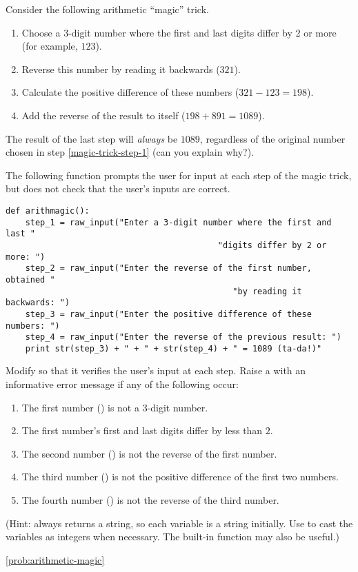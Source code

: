 \begin{problem} %
Consider the following arithmetic ``magic'' trick.
\begin{enumerate}
    \item Choose a 3-digit number where the first and last digits differ by 2 or more (for example, $123$).
    \label{magic-trick-step-1}
    \item Reverse this number by reading it backwards ($321$).
    \item Calculate the positive difference of these numbers ($321 - 123 = 198$).
    \item Add the reverse of the result to itself ($198 + 891 = 1089$).
\end{enumerate}
The result of the last step will \emph{always} be $1089$, regardless of the original number chosen in step \ref{magic-trick-step-1} (can you explain why?).

The following function prompts the user for input at each step of the magic trick, but does not check that the user's inputs are correct.
\newpage
\begin{lstlisting}
def arithmagic():
    step_1 = raw_input("Enter a 3-digit number where the first and last "
                                           "digits differ by 2 or more: ")
    step_2 = raw_input("Enter the reverse of the first number, obtained "
                                              "by reading it backwards: ")
    step_3 = raw_input("Enter the positive difference of these numbers: ")
    step_4 = raw_input("Enter the reverse of the previous result: ")
    print str(step_3) + " + " + str(step_4) + " = 1089 (ta-da!)"
\end{lstlisting}

Modify  so that it verifies the user's input at each step.
Raise a  with an informative error message if any of the following occur:
\begin{enumerate}
\item The first number () is not a 3-digit number.
\item The first number's first and last digits differ by less than $2$.
\item The second number () is not the reverse of the first number.
\item The third number () is not the positive difference of the first two numbers.
\item The fourth number () is not the reverse of the third number.
\end{enumerate}
%
(Hint:  always returns a string, so each variable is a string initially. Use  to cast the variables as integers when necessary. The built-in function  may also be useful.)

\ref{prob:arithmetic-magic}
\end{problem}

